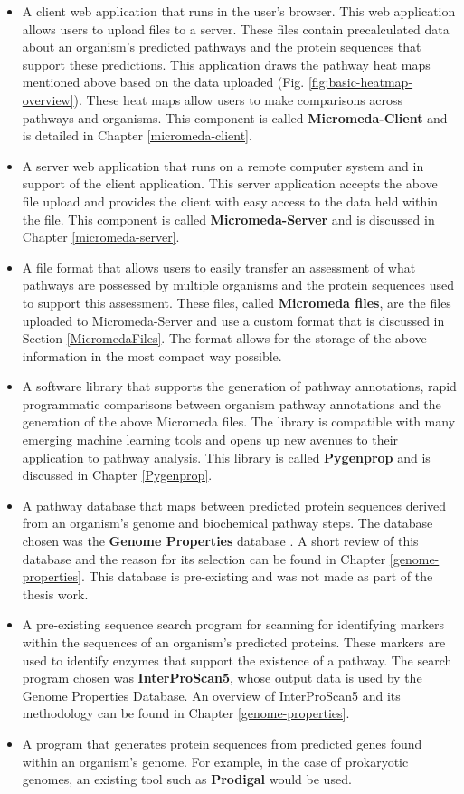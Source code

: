 \begin{itemize}
\item A client web application that runs in the user's browser. This web application allows users to upload files to a server. These files contain precalculated data about an organism's predicted pathways and the protein sequences that support these predictions. This application draws the pathway heat maps mentioned above based on the data uploaded (Fig. \ref{fig:basic-heatmap-overview}). These heat maps allow users to make comparisons across pathways and organisms. This component is called \textbf{Micromeda-Client} and is detailed in Chapter \ref{micromeda-client}.
\item A server web application that runs on a remote computer system and in support of the client application. This server application accepts the above file upload and provides the client with easy access to the data held within the file. This component is called \textbf{Micromeda-Server} and is discussed in Chapter \ref{micromeda-server}.
\item A file format that allows users to easily transfer an assessment of what pathways are possessed by multiple organisms and the protein sequences used to support this assessment. These files, called \textbf{Micromeda files}, are the files uploaded to Micromeda-Server and use a custom format that is discussed in Section \ref{MicromedaFiles}. The format allows for the storage of the above information in the most compact way possible.
\item A software library that supports the generation of pathway annotations, rapid programmatic comparisons between organism pathway annotations and the generation of the above Micromeda files. The library is compatible with many emerging machine learning tools and opens up new avenues to their application to pathway analysis. This library is called \textbf{Pygenprop} and is discussed in Chapter \ref{Pygenprop}.
\item A pathway database that maps between predicted protein sequences derived from an organism's genome and biochemical pathway steps. The database chosen was the \textbf{Genome Properties} database \cite{richardson2018genome}. A short review of this database and the reason for its selection can be found in Chapter \ref{genome-properties}. This database is pre-existing and was not made as part of the thesis work.
\item A pre-existing sequence search program for scanning for identifying markers within the sequences of an organism's predicted proteins. These markers are used to identify enzymes that support the existence of a pathway. The search program chosen was \textbf{InterProScan5}, whose output data is used by the Genome Properties Database. An overview of InterProScan5 \cite{jones2014interproscan} and its methodology can be found in Chapter \ref{genome-properties}.
\item A program that generates protein sequences from predicted genes found within an organism's genome. For example, in the case of prokaryotic genomes, an existing tool such as \textbf{Prodigal} \cite{hyatt2010prodigal} would be used. 
\end{itemize}

